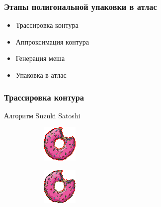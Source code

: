 \documentclass[10pt, unicode]{beamer}
\begin{document}
    \begin{frame}
        \frametitle{Этапы полигональной упаковки в атлас}
        \begin{itemize}
            \item Трассировка контура
            \item Аппроксимация контура
            \item Генерация меша
            \item Упаковка в атлас
        \end{itemize}
    \end{frame}
    \begin{frame}
        \frametitle{Трассировка контура}
        Алгоритм Suzuki Satoshi %
        \begin{figure}[H]
            \centering
            \begin{subfigure}[l]{0.50\linewidth}
                \centering
                \includegraphics[scale=2]{donutpixel_contour_none.png}
            \end{subfigure}
            \begin{subfigure}{0.49\linewidth}
                \centering
                \includegraphics[scale=2]{donutpixel_contour_simple.png}
            \end{subfigure}
        \end{figure}
    \end{frame}
\end{document}
